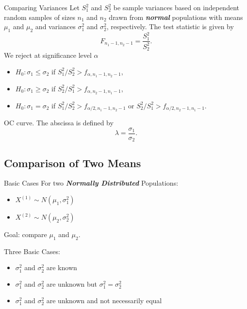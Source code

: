 \documentclass{beamer}
\newcommand{\bb}[1]{\textcolor{antiquefuchsia}{\textbf{\textit{#1}}}}
\begin{document}
\begin{frame}{Comparing Variances}
Let $S_{1}^{2}$ and $S_{2}^{2}$ be sample variances based on independent random samples of sizes $n_{1}$ and $n_{2}$ drawn from \bb{normal} populations with means $\mu_{1}$ and $\mu_{2}$ and variances $\sigma_{1}^{2}$ and $\sigma_{2}^{2}$, respectively. The test statistic is given by
$$
F_{n_{1}-1, n_{2}-1}=\frac{S_{1}^{2}}{S_{2}^{2}} .
$$
We reject at significance level $\alpha$
\begin{itemize}
\item $H_{0}: \sigma_{1} \leq \sigma_{2}$ if $S_{1}^{2} / S_{2}^{2}>f_{\alpha, n_{1}-1, n_{2}-1}$,
\item $H_{0}: \sigma_{1} \geq \sigma_{2}$ if $S_{2}^{2} / S_{1}^{2}>f_{\alpha, n_{2}-1, n_{1}-1}$,
\item $H_{0}: \sigma_{1}=\sigma_{2}$ if $S_{1}^{2} / S_{2}^{2}>f_{\alpha / 2, n_{1}-1, n_{2}-1}$ or $S_{2}^{2} / S_{1}^{2}>f_{\alpha / 2, n_{2}-1, n_{1}-1}$. 
\end{itemize}

OC curve. The abscissa is defined by
$$
\lambda=\frac{\sigma_{1}}{\sigma_{2}} .
$$
\end{frame}

\subsection{Comparison of Two Means}
\begin{frame}{Basic Cases}
For two \bb{Normally Distributed} Populations:
\begin{itemize}
\item $X^{(1)} \sim N\left(\mu_{1}, \sigma_{1}^{2}\right)$
\item $X^{(2)} \sim N\left(\mu_{2}, \sigma_{2}^{2}\right)$
\end{itemize}
Goal: compare $\mu_{1}$ and $\mu_{2}$.

Three Basic Cases:
\begin{itemize}
\item $\sigma_{1}^{2}$ and $\sigma_{2}^{2}$ are known
\item $\sigma_{1}^{2}$ and $\sigma_{2}^{2}$ are unknown but $\sigma_{1}^{2}=\sigma_{2}^{2}$
\item $\sigma_{1}^{2}$ and $\sigma_{2}^{2}$ are unknown and not necessarily equal
\end{itemize}
\end{frame}
\end{document}
